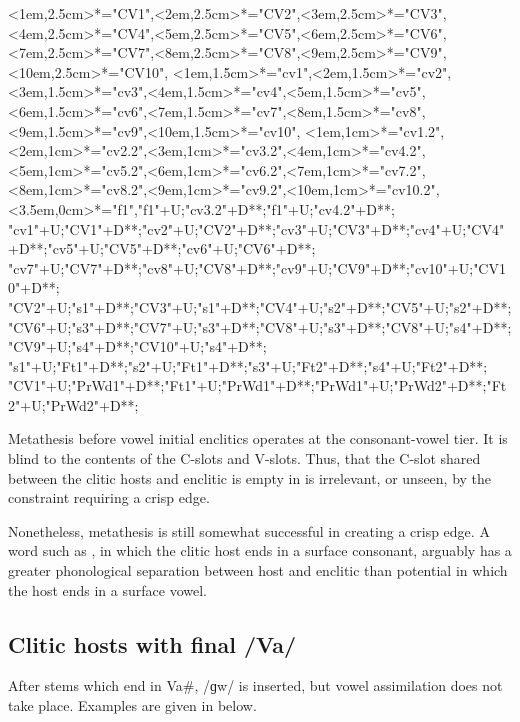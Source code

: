 \begin{multicols}{2}
\begin{exe}
{\begin{xlist}
{		<1em,2.5cm>*="CV1",<2em,2.5cm>*="CV2",<3em,2.5cm>*="CV3",<4em,2.5cm>*="CV4",<5em,2.5cm>*="CV5",<6em,2.5cm>*="CV6",
		<7em,2.5cm>*="CV7",<8em,2.5cm>*="CV8",<9em,2.5cm>*="CV9",<10em,2.5cm>*="CV10",
		<1em,1.5cm>*="cv1",<2em,1.5cm>*="cv2",<3em,1.5cm>*="cv3",<4em,1.5cm>*="cv4",<5em,1.5cm>*="cv5",<6em,1.5cm>*\as{\0}="cv6",<7em,1.5cm>*="cv7",<8em,1.5cm>*\as{ }="cv8",<9em,1.5cm>*="cv9",<10em,1.5cm>*\as{ }="cv10",
		<1em,1cm>*="cv1.2",<2em,1cm>*="cv2.2",<3em,1cm>*="cv3.2",<4em,1cm>*="cv4.2",<5em,1cm>*="cv5.2",<6em,1cm>*\as{\0}="cv6.2",<7em,1cm>*="cv7.2",<8em,1cm>*\as{ }="cv8.2",<9em,1cm>*="cv9.2",<10em,1cm>*\as{ }="cv10.2",
		<3.5em,0cm>*\as{\tsc{[+fr.]}}="f1","f1"+U;"cv3.2"+D**\dir{-};"f1"+U;"cv4.2"+D**\dir{-};
		"cv1"+U;"CV1"+D**\dir{-};"cv2"+U;"CV2"+D**\dir{-};"cv3"+U;"CV3"+D**\dir{-};"cv4"+U;"CV4"+D**\dir{-};"cv5"+U;"CV5"+D**\dir{-};"cv6"+U;"CV6"+D**\dir{-};
		"cv7"+U;"CV7"+D**\dir{-};"cv8"+U;"CV8"+D**\dir{};"cv9"+U;"CV9"+D**\dir{-};"cv10"+U;"CV10"+D**\dir{};
		"CV2"+U;"s1"+D**\dir{-};"CV3"+U;"s1"+D**\dir{-};"CV4"+U;"s2"+D**\dir{-};"CV5"+U;"s2"+D**\dir{-};
		"CV6"+U;"s3"+D**\dir{-};"CV7"+U;"s3"+D**\dir{-};"CV8"+U;"s3"+D**\dir{-};"CV8"+U;"s4"+D**\dir{-};"CV9"+U;"s4"+D**\dir{-};"CV10"+U;"s4"+D**\dir{-};
		"s1"+U;"Ft1"+D**\dir{-};"s2"+U;"Ft1"+D**\dir{-};"s3"+U;"Ft2"+D**\dir{-};"s4"+U;"Ft2"+D**\dir{-};
		"CV1"+U;"PrWd1"+D**\dir{-};"Ft1"+U;"PrWd1"+D**\dir{-};"PrWd1"+U;"PrWd2"+D**\dir{-};"Ft2"+U;"PrWd2"+D**\dir{-};
	\endxy}
	\end{xlist}}
\end{exe}
\end{multicols}

Metathesis before vowel initial enclitics operates at the consonant-vowel tier.
It is blind to the contents of the C-slots and V-slots.
Thus, that the C-slot shared between the clitic hosts and enclitic is empty
in  is irrelevant, or unseen, by the constraint requiring a crisp edge.

Nonetheless, metathesis is still somewhat successful in creating a crisp edge.
A word such as , in which the clitic host ends in a surface consonant,
arguably has a greater phonological separation between host and enclitic
than potential  in which the host ends in a surface vowel.

\subsection{Clitic hosts with final /Va/}
After stems which end in Va{\#},
/ɡw/ is inserted, but vowel assimilation does not take place.
Examples are given in  below.

